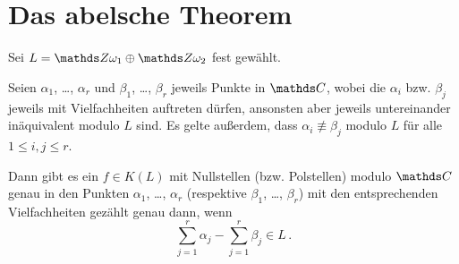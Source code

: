 \section{Das abelsche Theorem}

Sei $L = \ZZ\omega_1 \oplus \ZZ\omega_2$ fest gewählt.

\begin{satz}
Seien $\alpha_1$, \ldots, $\alpha_r$ und $\beta_1$, \ldots, $\beta_r$ jeweils Punkte in $\CC$, wobei die $\alpha_i$ bzw. $\beta_j$ jeweils mit Vielfachheiten auftreten dürfen, ansonsten aber jeweils untereinander inäquivalent modulo $L$ sind.
Es gelte außerdem, dass $\alpha_i \not\equiv \beta_j$ modulo $L$ für alle $1 \leq i,j \leq r$.

Dann gibt es ein $f\in K(L)$ mit Nullstellen (bzw. Polstellen) modulo $\CC$ genau in den Punkten $\alpha_1$, \ldots, $\alpha_r$ (respektive $\beta_1$, \ldots, $\beta_r$) mit den entsprechenden Vielfachheiten gezählt genau dann, wenn
\begin{equation}\label{eqn:abelsches-thm}
	\sum_{j=1}^r \alpha_j - \sum_{j=1}^r \beta_j \in L
	\,.
\end{equation}
\end{satz}

